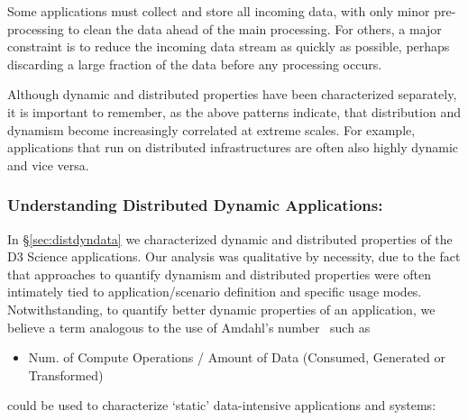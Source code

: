 Some applications must collect and store all incoming data, with only minor
pre-processing to clean the data ahead of the main processing. For others, a
major constraint is to reduce the incoming data stream as quickly as possible,
perhaps discarding a large fraction of the data before any processing occurs.

Although dynamic and distributed properties have been characterized
separately, it is important to remember, as the above patterns
indicate, that distribution and dynamism become increasingly
correlated at extreme scales.  For example, applications that run on
distributed infrastructures are often also highly dynamic and vice
versa.











\subsubsection{Understanding Distributed Dynamic Applications: }
\label{sec:quantifyingdistapps}

In \S\ref{sec:distdyndata} we characterized dynamic and distributed
properties of the D3 Science applications. Our analysis was
qualitative by necessity, due to the fact that approaches to quantify
dynamism and distributed properties were often intimately tied to
application/scenario definition and specific usage modes.
Notwithstanding, to quantify better dynamic properties of an
application, we believe a term analogous to the use of Amdahl's
number~\cite{10.1109/ICDE.2000.839382} such as
\begin{itemize}
\item[] Num. of Compute Operations / Amount of Data
  (Consumed, Generated or Transformed)
\end{itemize}
  could be used to characterize `static'
data-intensive applications and systems:

